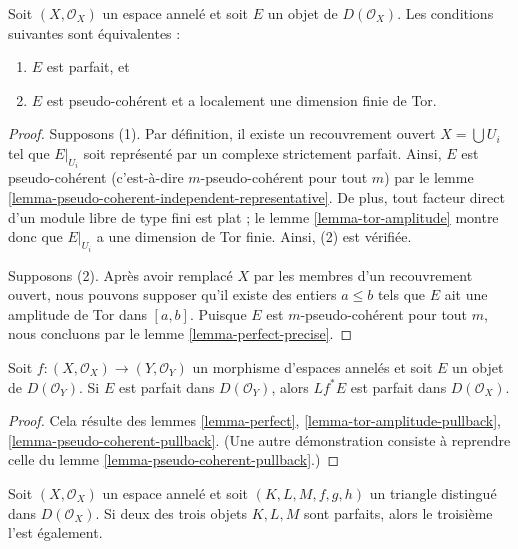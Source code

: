 \begin{lemma}

\label{lemma-perfect}
Soit $(X, \mathcal{O}_X)$ un espace annelé et soit $E$ un objet de $D(\mathcal{O}_X)$. Les conditions suivantes sont équivalentes :
\begin{enumerate}
\item $E$ est parfait, et
\item $E$ est pseudo-cohérent et a localement une dimension finie de Tor.
\end{enumerate}

\end{lemma}

\begin{proof}
Supposons (1). Par définition, il existe un recouvrement ouvert $X = \bigcup U_i$ tel que $E|_{U_i}$ soit représenté par un complexe strictement parfait. Ainsi, $E$ est pseudo-cohérent (c'est-à-dire $m$-pseudo-cohérent pour tout $m$) par le lemme \ref{lemma-pseudo-coherent-independent-representative}. De plus, tout facteur direct d'un module libre de type fini est plat ; le lemme \ref{lemma-tor-amplitude} montre donc que $E|_{U_i}$ a une dimension de Tor finie. Ainsi, (2) est vérifiée.

\medskip\noindent
Supposons (2). Après avoir remplacé $X$ par les membres d'un recouvrement ouvert, nous pouvons supposer qu'il existe des entiers $a \leq b$ tels que $E$ ait une amplitude de Tor dans $[a, b]$. Puisque $E$ est $m$-pseudo-cohérent pour tout $m$, nous concluons par le lemme \ref{lemma-perfect-precise}.
\end{proof}

\begin{lemma}

\label{lemma-perfect-pullback}
Soit $f : (X, \mathcal{O}_X) \to (Y, \mathcal{O}_Y)$ un morphisme d'espaces annelés et soit $E$ un objet de $D(\mathcal{O}_Y)$. Si $E$ est parfait dans $D(\mathcal{O}_Y)$, alors $Lf^*E$ est parfait dans $D(\mathcal{O}_X)$.
\end{lemma}

\begin{proof}

Cela résulte des lemmes \ref{lemma-perfect},
\ref{lemma-tor-amplitude-pullback},
\ref{lemma-pseudo-coherent-pullback}. (Une autre démonstration consiste à reprendre celle du lemme \ref{lemma-pseudo-coherent-pullback}.)

\end{proof}

\begin{lemma}

\label{lemma-two-out-of-three-perfect}

Soit $(X, \mathcal{O}_X)$ un espace annelé et soit $(K, L, M, f, g, h)$
un triangle distingué dans $D(\mathcal{O}_X)$. Si deux des trois objets
$K, L, M$ sont parfaits, alors le troisième l'est également.

\end{lemma}


